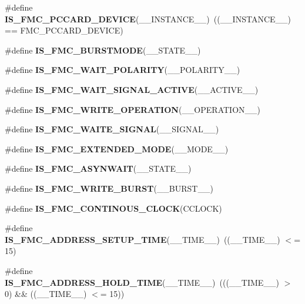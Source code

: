 \begin{DoxyCompactItemize}
\item 
\#define {\bfseries I\+S\+\_\+\+F\+M\+C\+\_\+\+P\+C\+C\+A\+R\+D\+\_\+\+D\+E\+V\+I\+CE}(\+\_\+\+\_\+\+I\+N\+S\+T\+A\+N\+C\+E\+\_\+\+\_\+)~((\+\_\+\+\_\+\+I\+N\+S\+T\+A\+N\+C\+E\+\_\+\+\_\+) == F\+M\+C\+\_\+\+P\+C\+C\+A\+R\+D\+\_\+\+D\+E\+V\+I\+CE)\hypertarget{group___f_s_m_c___l_l___assert___macros_gaba45bb84fc770dd07b0876ea74cb1009}{}\label{group___f_s_m_c___l_l___assert___macros_gaba45bb84fc770dd07b0876ea74cb1009}

\item 
\#define {\bfseries I\+S\+\_\+\+F\+M\+C\+\_\+\+B\+U\+R\+S\+T\+M\+O\+DE}(\+\_\+\+\_\+\+S\+T\+A\+T\+E\+\_\+\+\_\+)
\item 
\#define {\bfseries I\+S\+\_\+\+F\+M\+C\+\_\+\+W\+A\+I\+T\+\_\+\+P\+O\+L\+A\+R\+I\+TY}(\+\_\+\+\_\+\+P\+O\+L\+A\+R\+I\+T\+Y\+\_\+\+\_\+)
\item 
\#define {\bfseries I\+S\+\_\+\+F\+M\+C\+\_\+\+W\+A\+I\+T\+\_\+\+S\+I\+G\+N\+A\+L\+\_\+\+A\+C\+T\+I\+VE}(\+\_\+\+\_\+\+A\+C\+T\+I\+V\+E\+\_\+\+\_\+)
\item 
\#define {\bfseries I\+S\+\_\+\+F\+M\+C\+\_\+\+W\+R\+I\+T\+E\+\_\+\+O\+P\+E\+R\+A\+T\+I\+ON}(\+\_\+\+\_\+\+O\+P\+E\+R\+A\+T\+I\+O\+N\+\_\+\+\_\+)
\item 
\#define {\bfseries I\+S\+\_\+\+F\+M\+C\+\_\+\+W\+A\+I\+T\+E\+\_\+\+S\+I\+G\+N\+AL}(\+\_\+\+\_\+\+S\+I\+G\+N\+A\+L\+\_\+\+\_\+)
\item 
\#define {\bfseries I\+S\+\_\+\+F\+M\+C\+\_\+\+E\+X\+T\+E\+N\+D\+E\+D\+\_\+\+M\+O\+DE}(\+\_\+\+\_\+\+M\+O\+D\+E\+\_\+\+\_\+)
\item 
\#define {\bfseries I\+S\+\_\+\+F\+M\+C\+\_\+\+A\+S\+Y\+N\+W\+A\+IT}(\+\_\+\+\_\+\+S\+T\+A\+T\+E\+\_\+\+\_\+)
\item 
\#define {\bfseries I\+S\+\_\+\+F\+M\+C\+\_\+\+W\+R\+I\+T\+E\+\_\+\+B\+U\+R\+ST}(\+\_\+\+\_\+\+B\+U\+R\+S\+T\+\_\+\+\_\+)
\item 
\#define {\bfseries I\+S\+\_\+\+F\+M\+C\+\_\+\+C\+O\+N\+T\+I\+N\+O\+U\+S\+\_\+\+C\+L\+O\+CK}(C\+C\+L\+O\+CK)
\item 
\#define {\bfseries I\+S\+\_\+\+F\+M\+C\+\_\+\+A\+D\+D\+R\+E\+S\+S\+\_\+\+S\+E\+T\+U\+P\+\_\+\+T\+I\+ME}(\+\_\+\+\_\+\+T\+I\+M\+E\+\_\+\+\_\+)~((\+\_\+\+\_\+\+T\+I\+M\+E\+\_\+\+\_\+) $<$= 15)\hypertarget{group___f_s_m_c___l_l___assert___macros_ga4fadec8f0a31f6bdf492741ab05d0320}{}\label{group___f_s_m_c___l_l___assert___macros_ga4fadec8f0a31f6bdf492741ab05d0320}

\item 
\#define {\bfseries I\+S\+\_\+\+F\+M\+C\+\_\+\+A\+D\+D\+R\+E\+S\+S\+\_\+\+H\+O\+L\+D\+\_\+\+T\+I\+ME}(\+\_\+\+\_\+\+T\+I\+M\+E\+\_\+\+\_\+)~(((\+\_\+\+\_\+\+T\+I\+M\+E\+\_\+\+\_\+) $>$ 0) \&\& ((\+\_\+\+\_\+\+T\+I\+M\+E\+\_\+\+\_\+) $<$= 15))\hypertarget{group___f_s_m_c___l_l___assert___macros_ga6fb34ef685df279f1cbde9cf83601edd}{}\label{group___f_s_m_c___l_l___assert___macros_ga6fb34ef685df279f1cbde9cf83601edd}


\end{DoxyCompactItemize}
